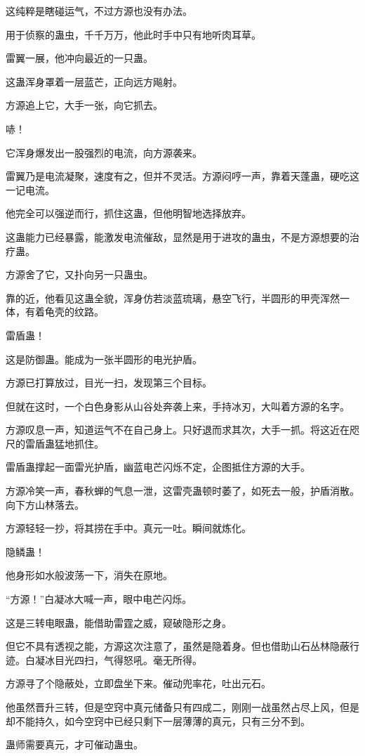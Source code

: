 \begin{this_body}
这纯粹是瞎碰运气，不过方源也没有办法。

用于侦察的蛊虫，千千万万，他此时手中只有地听肉耳草。

雷翼一展，他冲向最近的一只蛊。

这蛊浑身罩着一层蓝芒，正向远方飚射。

方源追上它，大手一张，向它抓去。

哧！

它浑身爆发出一股强烈的电流，向方源袭来。

雷翼乃是电流凝聚，速度有之，但并不灵活。方源闷哼一声，靠着天蓬蛊，硬吃这一记电流。

他完全可以强逆而行，抓住这蛊，但他明智地选择放弃。

这蛊能力已经暴露，能激发电流催敌，显然是用于进攻的蛊虫，不是方源想要的治疗蛊。

方源舍了它，又扑向另一只蛊虫。

靠的近，他看见这蛊全貌，浑身仿若淡蓝琉璃，悬空飞行，半圆形的甲壳浑然一体，有着龟壳的纹路。

雷盾蛊！

这是防御蛊。能成为一张半圆形的电光护盾。

方源已打算放过，目光一扫，发现第三个目标。

但就在这时，一个白色身影从山谷处奔袭上来，手持冰刃，大叫着方源的名字。

方源叹息一声，知道运气不在自己身上。只好退而求其次，大手一抓。将这近在咫尺的雷盾蛊猛地抓住。

雷盾蛊撑起一面雷光护盾，幽蓝电芒闪烁不定，企图抵住方源的大手。

方源冷笑一声，春秋蝉的气息一泄，这雷壳蛊顿时萎了，如死去一般，护盾消散。向下方山林落去。

方源轻轻一抄，将其捞在手中。真元一吐。瞬间就炼化。

隐鳞蛊！

他身形如水般波荡一下，消失在原地。

“方源！”白凝冰大喊一声，眼中电芒闪烁。

这是三转电眼蛊，能借助雷霆之威，窥破隐形之身。

但它不具有透视之能，方源这次注意了，虽然是隐着身。但也借助山石丛林隐蔽行迹。白凝冰目光四扫，气得怒吼。毫无所得。

方源寻了个隐蔽处，立即盘坐下来。催动兜率花，吐出元石。

他虽然晋升三转，但是空窍中真元储备只有四成二，刚刚一战虽然占尽上风，但是却不能持久，如今空窍中已经只剩下一层薄薄的真元，只有三分不到。

蛊师需要真元，才可催动蛊虫。


\end{this_body}
